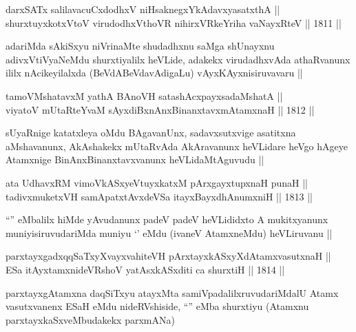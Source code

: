 \begin{shl}
darxSATx salilavacuCxdodhxV niHsaknegxYkAdavxyasatxthA || \\
shurxtuyxkotxV\s toV virudodhxV\s thoVR nihirxVRkeYriha vaNayxRteV ||  1811 ||  
\end{shl}

\begin{artha}
adariMda sAkiSxyu niVrinaMte shudadhxnu saMga shUnayxnu
adivxVtiVyaNeMdu shurxtiyalilx heVLide, adakekx virudadhxvAda
athaRvanunx ililx nAcikeyilalxda (BeVdABeVdavAdigaLu)
vAyxKAyxnisiruvavaru ||
\end{artha}


\begin{shl}
tamoVMshatavxM yathA BAnoVH satashAcxpayxsadaMshatA || \\
viyatoV mUtaRteYvaM sAyxdiBxnAnxBinanxtavxmAtamxnaH ||  1812 ||  
\end{shl}

\begin{artha}
sUyaRnige katatxleya oMdu BAgavanUnx, sadavxsutxvige asatitxna
aMshavanunx, AkAshakekx mUtaRvAda AkAravanunx heVLidare heVgo hAgeye
Atamxnige BinAnxBinanxtavxvanunx heVLidaMtAguvudu ||
\end{artha}


\begin{shl}
ata UdhavxRM vimoVkASxyeVtuyxkatxM pArxgayxtupxnaH punaH || \\
tadivxmuketxVH samApatxtAvxdeVSa itayxBayxdhAnumxniH ||  1813 ||  
\end{shl}

\begin{artha}
``\stext'' eMbalilx hiMde yAvudanunx padeV padeV heVLididxto A
mukitxyanunx muniyisiruvudariMda muniyu `\stext' eMdu (ivaneV
AtamxneMdu) heVLiruvanu ||
\end{artha}

\begin{shl}
parxtayxgadxqqSaTxyXvayxvahiteVH pArxtayxkASxyXdAtamxvasutxnaH || \\
ESa itAyxtamxnideVRshoV yatAsxkASxditi ca shurxtiH ||  1814 ||  
\end{shl}

\begin{artha}
parxtayxgAtamxna daqSiTxyu atayxMta samiVpadalilxruvudariMdalU Atamx
vasutxvanenx ESaH eMdu nideRVshiside, ``\stext'' eMba shurxtiyu
(Atamxnu parxtayxkaSxveMbudakekx parxmANa)
\end{artha}

